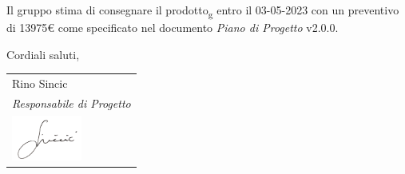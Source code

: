 \documentclass[10pt]{article}
\begin{document}
Il gruppo stima di consegnare il prodotto\textsubscript{g} entro il 03-05-2023 con un preventivo di 13975\euro{}  come
specificato nel documento \textit{Piano di Progetto} v2.0.0.


Cordiali saluti,

\vspace{15pt}

\hfill
\begin{tabular}{ l @{} }
Rino Sincic\\
\textit{Responsabile di Progetto}\\
\includegraphics[width=2.3cm]{images/Rino_Sincic_firma.png}
\end{tabular}
\end{document}
